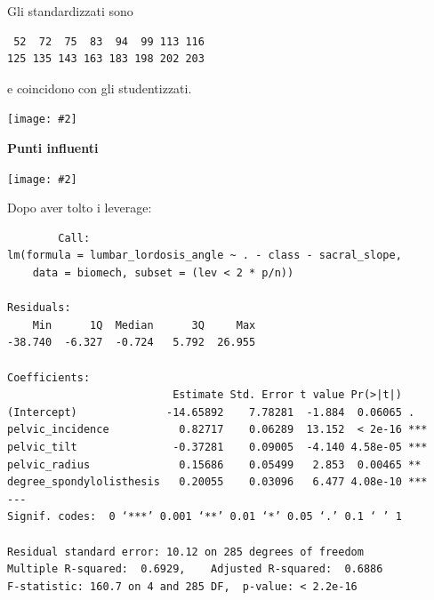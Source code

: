 \documentclass{beamer}
\newcommand{\fg}[2]{%
  \begin{center}
      \texttt{[image: \#2]}%
  \end{center}
}
\begin{document}
\begin{frame}[fragile]
	Gli standardizzati sono
	\begin{verbatim}
 52  72  75  83  94  99 113 116
125 135 143 163 183 198 202 203
	\end{verbatim}
	e coincidono con gli studentizzati.
\end{frame}


\begin{frame}
	\fg{0.6}{05graficone}
\end{frame}




\begin{frame}
	\textbf{Punti influenti}
	\fg{0.6}{06influencialPlot}
\end{frame}



\begin{frame}[fragile]
	Dopo aver tolto i leverage:

	{\tiny
	\begin{verbatim}
		Call:
lm(formula = lumbar_lordosis_angle ~ . - class - sacral_slope, 
    data = biomech, subset = (lev < 2 * p/n))

Residuals:
    Min      1Q  Median      3Q     Max 
-38.740  -6.327  -0.724   5.792  26.955 

Coefficients:
                          Estimate Std. Error t value Pr(>|t|)    
(Intercept)              -14.65892    7.78281  -1.884  0.06065 .  
pelvic_incidence           0.82717    0.06289  13.152  < 2e-16 ***
pelvic_tilt               -0.37281    0.09005  -4.140 4.58e-05 ***
pelvic_radius              0.15686    0.05499   2.853  0.00465 ** 
degree_spondylolisthesis   0.20055    0.03096   6.477 4.08e-10 ***
---
Signif. codes:  0 ‘***’ 0.001 ‘**’ 0.01 ‘*’ 0.05 ‘.’ 0.1 ‘ ’ 1

Residual standard error: 10.12 on 285 degrees of freedom
Multiple R-squared:  0.6929,	Adjusted R-squared:  0.6886 
F-statistic: 160.7 on 4 and 285 DF,  p-value: < 2.2e-16
	\end{verbatim}
	}
\end{frame}
\end{document}
